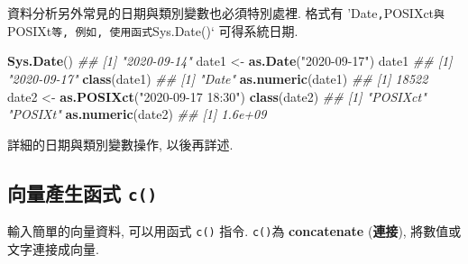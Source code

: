\documentclass[
]{book}
\newenvironment{Shaded}{\begin{snugshade}}{\end{snugshade}}
\newcommand{\CommentTok}[1]{\textcolor[rgb]{0.56,0.35,0.01}{\textit{#1}}}
\newcommand{\KeywordTok}[1]{\textcolor[rgb]{0.13,0.29,0.53}{\textbf{#1}}}
\newcommand{\NormalTok}[1]{#1}
\newcommand{\StringTok}[1]{\textcolor[rgb]{0.31,0.60,0.02}{#1}}
\begin{document}
資料分析另外常見的日期與類別變數也必須特別處裡.
格式有 'Date\texttt{,}POSIXct\texttt{與}POSIXt\texttt{等,\ 例如,\ 使用函式}Sys.Date()` 可得系統日期.

\begin{Shaded}
\begin{Highlighting}[]
\KeywordTok{Sys.Date}\NormalTok{()}
\CommentTok{\#\# [1] "2020{-}09{-}14"}
\NormalTok{date1 \textless{}{-}}\StringTok{ }\KeywordTok{as.Date}\NormalTok{(}\StringTok{"2020{-}09{-}17"}\NormalTok{)}
\NormalTok{date1}
\CommentTok{\#\# [1] "2020{-}09{-}17"}
\KeywordTok{class}\NormalTok{(date1)}
\CommentTok{\#\# [1] "Date"}
\KeywordTok{as.numeric}\NormalTok{(date1)}
\CommentTok{\#\# [1] 18522}
\NormalTok{date2 \textless{}{-}}\StringTok{ }\KeywordTok{as.POSIXct}\NormalTok{(}\StringTok{"2020{-}09{-}17 18:30"}\NormalTok{)}
\KeywordTok{class}\NormalTok{(date2)}
\CommentTok{\#\# [1] "POSIXct" "POSIXt"}
\KeywordTok{as.numeric}\NormalTok{(date2)}
\CommentTok{\#\# [1] 1.6e+09}
\end{Highlighting}
\end{Shaded}

詳細的日期與類別變數操作, 以後再詳述.

\hypertarget{ux5411ux91cfux7522ux751fux51fdux5f0f-c}{%
\subsection{\texorpdfstring{向量產生函式 \texttt{c()}}{向量產生函式 c()}}\label{ux5411ux91cfux7522ux751fux51fdux5f0f-c}}

輸入簡單的向量資料, 可以用函式
\texttt{c()}
指令.
\texttt{c()}為 \textbf{concatenate} (\textbf{連接}),
將數值或文字連接成向量.
\end{document}
